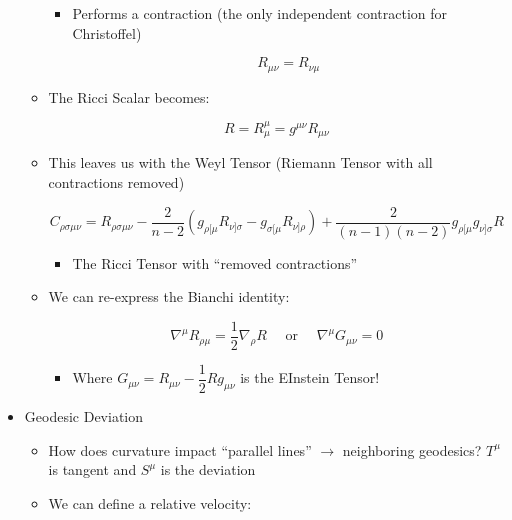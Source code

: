 \begin{itemize}
\begin{itemize}
\begin{itemize}
          \item Performs a contraction (the only independent contraction for Christoffel)

            $$R_{\mu\nu}=R_{\nu\mu}$$

        \end{itemize}

      \item The Ricci Scalar becomes:

        $$R=R^{\mu}_{\mu}=g^{\mu\nu}R_{\mu\nu}$$

      \item This leaves us with the Weyl Tensor (Riemann Tensor with all contractions removed)

        $$C_{\rho\sigma\mu\nu}=R_{\rho\sigma\mu\nu}-\frac{2}{n-2}(g_{\rho[\mu}R_{\nu]\sigma}-g_{\sigma[\mu}R_{\nu]\rho})+\frac{2}{(n-1)(n-2)}g_{\rho[\mu}g_{\nu]\sigma}R$$

        \begin{itemize}

          \item The Ricci Tensor with ``removed contractions''

        \end{itemize}

      \item We can re-express the Bianchi identity:

        $$\nabla^{\mu}R_{\rho\mu}=\frac{1}{2}\nabla_{\rho}R\quad\text{ or } \quad\nabla^{\mu}G_{\mu\nu}=0$$

        \begin{itemize}

          \item Where $G_{\mu\nu}=R_{\mu\nu}-\dfrac{1}{2}Rg_{\mu\nu}$ is the EInstein Tensor!

        \end{itemize}

    \end{itemize}

  \item Geodesic Deviation

    \begin{itemize}

      \item How does curvature impact ``parallel lines'' $\to$ neighboring geodesics? $T^{\mu}$ is tangent and $S^{\mu}$ is the deviation

      \item We can define a relative velocity:


\end{itemize}
\end{itemize}
